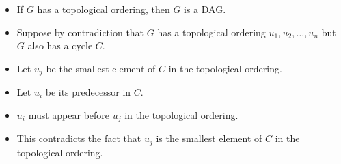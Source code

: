 \documentclass[onecolumn]{report}
\begin{document}
\begin{itemize}
    \item If $G$ has a topological ordering, then $G$ is a DAG.
    \item Suppose by contradiction that $G$ has a topological ordering $u_1,u_2,\dots,u_n$ but $G$ also has a cycle $C$.
    \item Let $u_j$ be the smallest element of $C$ in the topological ordering.
    \item Let $u_i$ be its predecessor in $C$.
    \item $u_i$ must appear before $u_j$ in the topological ordering.
    \item This contradicts the fact that $u_j$ is the smallest element of $C$ in the topological ordering.
\end{itemize}
\end{document}

